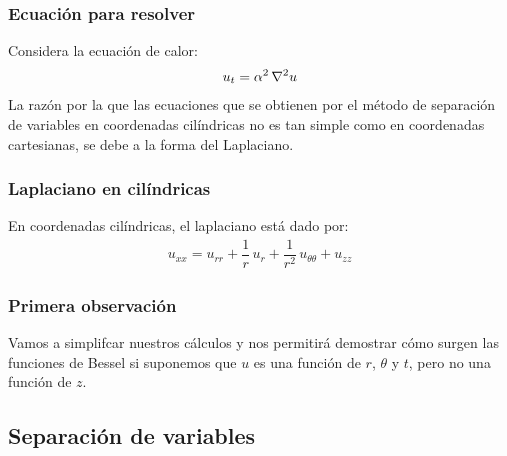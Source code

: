 \documentclass[12pt]{beamer}
\begin{document}
\begin{frame}
\frametitle{Ecuación para resolver}
Considera la ecuación de calor:
\pause
\begin{align*}
u_{t} =  \alpha^{2} \,  \laplacian{u}
\end{align*}
La razón por la que las ecuaciones que se obtienen por el método de separación de variables en coordenadas cilíndricas no es tan simple como en coordenadas cartesianas, se debe a la forma del Laplaciano. 
\end{frame}
\begin{frame}
\frametitle{Laplaciano en cilíndricas}
En coordenadas cilíndricas, el laplaciano está dado por:
\pause
\begin{align*}
u_{xx} = u_{rr} + \dfrac{1}{r} \, u_{r} + \dfrac{1}{r^{2}} \, u_{\theta \theta} + u_{zz}
\end{align*}
\end{frame}
\begin{frame}
\frametitle{Primera observación}
Vamos a simplifcar nuestros cálculos y nos permitirá demostrar cómo surgen las funciones de Bessel si suponemos que $u$ es una función de $r$, $\theta$ y $t$, pero no una función de $z$.
\end{frame}

\subsection{Separación de variables}
\end{document}
